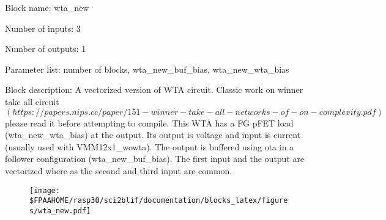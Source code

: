 \pagebreak
Block name: wta\_new

Number of inputs: 3

Number of outputs: 1

Parameter list: number of blocks, wta\_new\_buf\_bias, wta\_new\_wta\_bias

Block description: 
A vectorized version of WTA circuit. Classic work on winner take all circuit $(https://papers.nips.cc/paper/151-winner-take-all-networks-of-on-complexity.pdf)$ please read it before attempting to compile. 
This WTA has a FG pFET load (wta\_new\_wta\_bias) at the output. Its output is voltage and input is current (usually used with VMM12x1\_wowta).
The output is buffered using ota in a follower configuration (wta\_new\_buf\_bias). The first input and the output are vectorized where as the second and third input are common.



\begin{figure}[H]  %
\texttt{[image: \$FPAAHOME/rasp30/sci2blif/documentation/blocks\_latex/figures/wta\_new.pdf]}
\end{figure}

